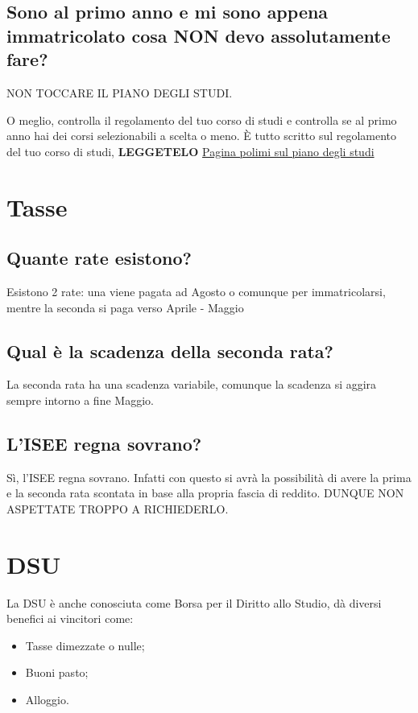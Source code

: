 \documentclass[legal]{polinetwork}
\begin{document}
\subsection{Sono al primo anno e mi sono appena immatricolato cosa NON devo assolutamente fare?}


NON TOCCARE IL PIANO DEGLI STUDI.

O meglio, controlla il regolamento del tuo corso di studi e controlla se al primo anno hai dei corsi selezionabili a scelta o meno. È tutto scritto sul regolamento del tuo corso di studi, \textbf{LEGGETELO}
\href{https://www.polimi.it/studenti/piano-degli-studi-e-ofa}{Pagina polimi sul piano degli studi}


\section{Tasse}


\subsection{Quante rate esistono?}


Esistono 2 rate: una viene pagata ad Agosto o comunque per immatricolarsi, mentre la seconda si paga verso Aprile - Maggio

\subsection{Qual è la scadenza della seconda rata?}


La seconda rata ha una scadenza variabile, comunque la scadenza si aggira sempre intorno a fine Maggio.

\subsection{L'ISEE regna sovrano?}


Sì, l'ISEE regna sovrano. Infatti con questo si avrà la possibilità di avere la prima e la seconda rata scontata in base alla propria fascia di reddito. DUNQUE NON ASPETTATE TROPPO A RICHIEDERLO.

\section{DSU}


La DSU è anche conosciuta come Borsa per il Diritto allo Studio, dà diversi benefici ai vincitori come:

\begin{itemize}
  \item Tasse dimezzate o nulle;
  \item Buoni pasto;
  \item Alloggio.
\end{itemize}
\end{document}
